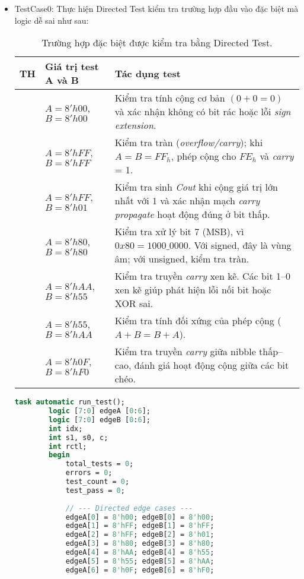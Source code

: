 \begin{itemize}[label=-]
	\item TestCase0: Thực hiện Directed Test kiểm tra trường hợp đầu vào đặc biệt mà logic dễ sai như sau:
	
	\begin{table}[H]
		\centering
		\begin{tabular}{|>{\centering\arraybackslash}m{1cm}
				|>{\centering\arraybackslash}m{3.5cm}
				|>{\arraybackslash}m{8.5cm}|}
			\hline
			\textbf{TH} & \textbf{Giá trị test A và B} & \textbf{Tác dụng test} \\ \hline
			1 & $A = 8'h00$, $B = 8'h00$ & Kiểm tra tính cộng cơ bản $(0 + 0 = 0)$ và xác nhận không có bit rác hoặc lỗi \textit{sign extension}. \\ \hline
			2 & $A = 8'hFF$, $B = 8'hFF$ & Kiểm tra tràn (\textit{overflow/carry}); khi $A = B = FF_h$, phép cộng cho $FE_h$ và \textit{carry} = 1. \\ \hline
			3 & $A = 8'hFF$, $B = 8'h01$ & Kiểm tra sinh \textit{Cout} khi cộng giá trị lớn nhất với 1 và xác nhận mạch \textit{carry propagate} hoạt động đúng ở bit thấp. \\ \hline
			4 & $A = 8'h80$, $B = 8'h80$ & Kiểm tra xử lý bit 7 (MSB), vì $0x80 = 1000\_0000$. Với signed, đây là vùng âm; với unsigned, kiểm tra tràn. \\ \hline
			5 & $A = 8'hAA$, $B = 8'h55$ & Kiểm tra truyền \textit{carry} xen kẽ. Các bit 1–0 xen kẽ giúp phát hiện lỗi nối bit hoặc XOR sai. \\ \hline
			6 & $A = 8'h55$, $B = 8'hAA$ & Kiểm tra tính đối xứng của phép cộng ($A + B = B + A$). \\ \hline
			7 & $A = 8'h0F$, $B = 8'hF0$ & Kiểm tra truyền \textit{carry} giữa nibble thấp–cao, đánh giá hoạt động cộng giữa các bit chéo. \\ \hline
		\end{tabular}
		\caption{Trường hợp đặc biệt được kiểm tra bằng Directed Test.}
	\end{table}
	
	\begin{lstlisting}[style=StyleCode, language=SystemVerilog, caption={Thực hiện Directed Test.}]
		task automatic run_test();
		logic [7:0] edgeA [0:6];
		logic [7:0] edgeB [0:6];
		int idx;
		int s1, s0, c;
		int rctl;
		begin
			total_tests = 0;
			errors = 0;
			test_count = 0;
			test_pass = 0;
			
			// --- Directed edge cases ---
			edgeA[0] = 8'h00; edgeB[0] = 8'h00;
			edgeA[1] = 8'hFF; edgeB[1] = 8'hFF;
			edgeA[2] = 8'hFF; edgeB[2] = 8'h01;
			edgeA[3] = 8'h80; edgeB[3] = 8'h80;
			edgeA[4] = 8'hAA; edgeB[4] = 8'h55;
			edgeA[5] = 8'h55; edgeB[5] = 8'hAA;
			edgeA[6] = 8'h0F; edgeB[6] = 8'hF0;
			

\end{lstlisting}
\end{itemize}
